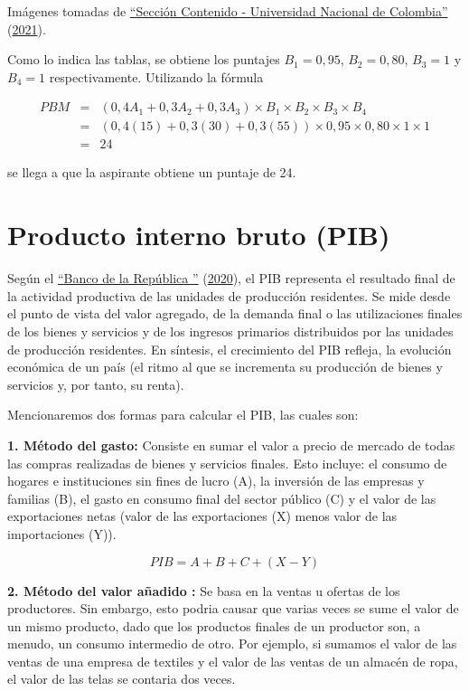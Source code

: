 \documentclass[
  11pt,
]{book}
\begin{document}
Imágenes tomadas de \protect\hyperlink{ref-BibEntry2021Maria}{{``{Secci{ó}n Contenido - Universidad Nacional de Colombia}''}} (\protect\hyperlink{ref-BibEntry2021Maria}{2021}).

Como lo indica las tablas, se obtiene los puntajes \(B_1=0,95\), \(B_2=0,80\), \(B_3=1\) y \(B_4=1\) respectivamente. Utilizando la fórmula

\[\begin{eqnarray}
PBM&=&(0,4A_1+0,3A_2+0,3A_3)\times B_1 \times B_2 \times B_3 \times B_4\\
&=& (0,4(15)+0,3(30)+0,3(55))\times 0,95 \times 0,80 \times 1 \times 1\\
&=& 24
\end{eqnarray}\]

se llega a que la aspirante obtiene un puntaje de 24.

\hypertarget{PIB}{%
\chapter{Producto interno bruto (PIB)}\label{PIB}}

Según el \protect\hyperlink{ref-BibEntry2020Jul}{{``{Banco de la Rep{ú\fi}blica }''}} (\protect\hyperlink{ref-BibEntry2020Jul}{2020}), el PIB representa el resultado final de la actividad productiva de las unidades de producción residentes. Se mide desde el punto de vista del valor agregado, de la demanda final o las utilizaciones finales de los bienes y servicios y de los ingresos primarios distribuidos por las unidades de producción residentes. En síntesis, el crecimiento del PIB refleja, la evolución económica de un país (el ritmo al que se incrementa su producción de bienes y servicios y, por tanto, su renta).

Mencionaremos dos formas para calcular el PIB, las cuales son:

\textbf{1. Método del gasto:} Consiste en sumar el valor a precio de mercado de todas las compras realizadas de bienes y servicios finales. Esto incluye: el consumo de hogares e instituciones sin fines de lucro (A), la inversión de las empresas y familias (B), el gasto en consumo final del sector público (C) y el valor de las exportaciones netas (valor de las exportaciones (X) menos valor de las importaciones (Y)).

\[\begin{equation}
PIB= A+B+C+(X-Y)
\end{equation}\]

\textbf{2. Método del valor añadido :} Se basa en la ventas u ofertas de los productores. Sin embargo, esto podria causar que varias veces se sume el valor de un mismo producto, dado que los productos finales de un productor son, a menudo, un consumo intermedio de otro. Por ejemplo, si sumamos el valor de las ventas de una empresa de textiles y el valor de las ventas de un almacén de ropa, el valor de las telas se contaria dos veces.
\end{document}
